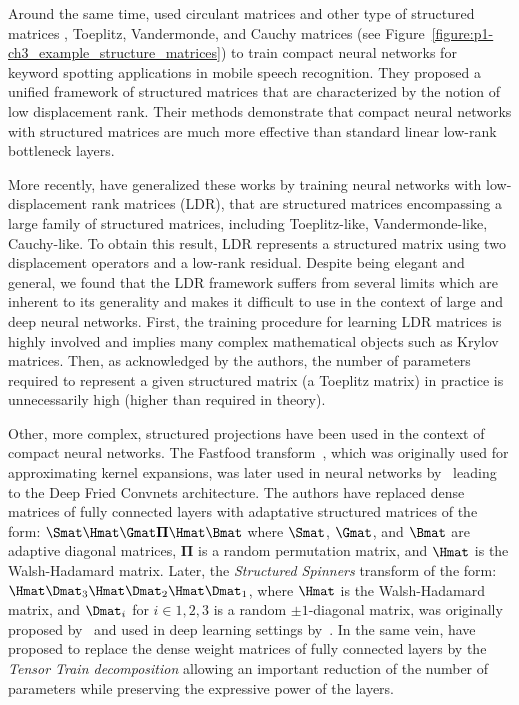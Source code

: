 Around the same time, \citet{sindhwani2015structured} used circulant matrices and other type of structured matrices \eg, Toeplitz, Vandermonde, and Cauchy matrices (see Figure~\ref{figure:p1-ch3_example_structure_matrices}) to train compact neural networks for keyword spotting applications in mobile speech recognition.
They proposed a unified framework of structured matrices that are characterized by the notion of low displacement rank.
Their methods demonstrate that compact neural networks with structured matrices are much more effective than standard linear low-rank bottleneck layers.

More recently, \citet{thomas2018learning} have generalized these works by training neural networks with low-displacement rank matrices (LDR), that are structured matrices encompassing a large family of structured matrices, including Toeplitz-like, Vandermonde-like, Cauchy-like.
To obtain this result, LDR represents a structured matrix using two displacement operators and a low-rank residual.
Despite being elegant and general, we found that the LDR framework suffers from several limits which are inherent to its generality and makes it difficult to use in the context of large and deep neural networks.
First, the training procedure for learning LDR matrices is highly involved and implies many complex mathematical objects such as Krylov matrices.
Then, as acknowledged by the authors, the number of parameters required to represent a given structured matrix (a Toeplitz matrix) in practice is unnecessarily high (higher than required in theory). 

Other, more complex, structured projections have been used in the context of compact neural networks.
The Fastfood transform~\cite{le2013fastfood}, which was originally used for approximating kernel expansions, was later used in neural networks by~\citet{yang2015deep} leading to the Deep Fried Convnets architecture.
The authors have replaced dense matrices of fully connected layers with adaptative structured matrices of the form: $\Smat\Hmat\Gmat\mathbf{\Pi}\Hmat\Bmat$ where $\Smat$, $\Gmat$, and $\Bmat$ are adaptive diagonal matrices, $\mathbf{\Pi}$ is a random permutation matrix, and $\Hmat$ is the Walsh-Hadamard matrix.
Later, the \emph{Structured Spinners} transform of the form: $\Hmat\Dmat_3\Hmat\Dmat_2\Hmat\Dmat_1$, where $\Hmat$ is the Walsh-Hadamard matrix, and $\Dmat_i$ for $i \in {1, 2, 3}$ is a random $\pm1$-diagonal matrix, was originally proposed by~\citet{andoni2015practical} and used in deep learning settings by~\citet{bojarski2017structured}.
In the same vein, \citet{novikov2015tensorizing} have proposed to replace the dense weight matrices of fully connected layers by the \emph{Tensor Train decomposition} allowing an important reduction of the number of parameters while preserving the expressive power of the layers.


